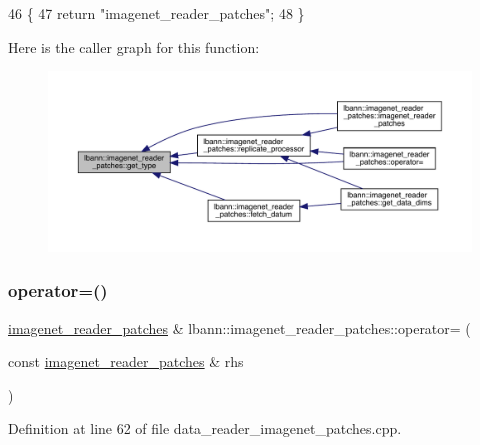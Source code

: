 \begin{DoxyCode}
46                                       \{
47     \textcolor{keywordflow}{return} \textcolor{stringliteral}{"imagenet\_reader\_patches"};
48   \}
\end{DoxyCode}
Here is the caller graph for this function\+:\nopagebreak
\begin{figure}[H]
\begin{center}
\leavevmode
\includegraphics[width=350pt]{classlbann_1_1imagenet__reader__patches_adc6363b20f058260c674d92af2a6ef80_icgraph}
\end{center}
\end{figure}
\mbox{\label{classlbann_1_1imagenet__reader__patches_a02e20aa26fb3b024486b8d5c71d37aa7}} 
\subsubsection{\texorpdfstring{operator=()}{operator=()}}
{\footnotesize\ttfamily \hyperlink{classlbann_1_1imagenet__reader__patches}{imagenet\+\_\+reader\+\_\+patches} \& lbann\+::imagenet\+\_\+reader\+\_\+patches\+::operator= (\begin{DoxyParamCaption}\item[{const \hyperlink{classlbann_1_1imagenet__reader__patches}{imagenet\+\_\+reader\+\_\+patches} \&}]{rhs }\end{DoxyParamCaption})}



Definition at line 62 of file data\+\_\+reader\+\_\+imagenet\+\_\+patches.\+cpp.



